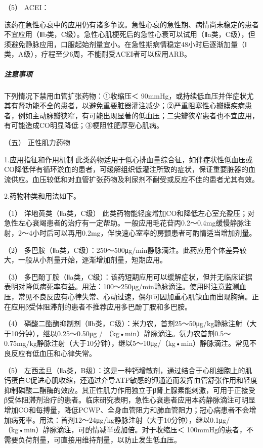 \hypertarget{text00071.htmlux5cux23CHP3-2-5-5-4-4-3-5}{}
（5） ACEI：

该药在急性心衰中的应用仍有诸多争议。急性心衰的急性期、病情尚未稳定的患者不宜应用（Ⅱb类，C级）。急性心肌梗死后的急性心衰可以试用（Ⅱa类，C级），但须避免静脉应用，口服起始剂量宜小。在急性期病情稳定48小时后逐渐加量（Ⅰ类，A级），疗程至少6周，不能耐受ACEI者可以应用ARB。

\subparagraph{注意事项}

下列情况下禁用血管扩张药物：①收缩压＜
90mmHg，或持续低血压并伴症状尤其有肾功能不全的患者，以避免重要脏器灌注减少；②严重阻塞性心瓣膜疾病患者，例如主动脉瓣狭窄，有可能出现显著的低血压；二尖瓣狭窄患者也不宜应用，有可能造成CO明显降低；③梗阻性肥厚型心肌病。

\hypertarget{text00071.htmlux5cux23CHP3-2-5-5-4-5}{}
（五） 正性肌力药物

1.应用指征和作用机制
此类药物适用于低心排血量综合征，如伴症状性低血压或CO降低伴有循环淤血的患者，可缓解组织低灌注所致的症状，保证重要脏器的血流供应。血压较低和对血管扩张药物及利尿剂不耐受或反应不佳的患者尤其有效。

2.药物种类和用法如下。

（1） 洋地黄类（Ⅱa类，C级）
此类药物能轻度增加CO和降低左心室充盈压；对急性左心衰竭患者的治疗有一定帮助。一般应用毛花苷丙0.2～0.4mg缓慢静脉注射，2～4小时后可以再用0.2mg，伴快速心室率的房颤患者可酌情适当增加剂量。

（2）
多巴胺（Ⅱa类，C级）：250～500μg/min静脉滴注。此药应用个体差异较大，一般从小剂量开始，逐渐增加剂量，短期应用。

（3）
多巴酚丁胺（Ⅱa类，C级）：该药短期应用可以缓解症状，但并无临床证据表明对降低病死率有益。用法：100～250μg/min静脉滴注。使用时注意监测血压，常见不良反应有心律失常、心动过速，偶尔可因加重心肌缺血而出现胸痛。正在应用β受体阻滞剂的患者不推荐应用多巴酚丁胺和多巴胺。

（4）
磷酸二酯酶抑制剂（Ⅱb类，C级）：米力农，首剂25～50μg/kg静脉注射（大于10分钟），继以0.25～0.50μg
/
（kg•min）静脉滴注。氨力农首剂0.5～0.75mg/kg静脉注射（大于10分钟），继以5～10μg/（kg•min）静脉滴注。常见不良反应有低血压和心律失常。

（5）
左西孟旦（Ⅱa类，B级）：这是一种钙增敏剂，通过结合于心肌细胞上的肌钙蛋白C促进心肌收缩，还通过介导ATP敏感的钾通道而发挥血管舒张作用和轻度抑制磷酸二酯酶的效应。其正性肌力作用独立于β肾上腺素能刺激，可用于正接受β受体阻滞剂治疗的患者。临床研究表明，急性心衰患者应用本药静脉滴注可明显增加CO和每搏量，降低PCWP、全身血管阻力和肺血管阻力；冠心病患者不会增加病死率。用法：首剂12～24μg/kg静脉注射（大于10分钟），继以0.1μg/（kg•min）静脉滴注，可酌情减半或加倍。对于收缩压＜
100mmHg的患者，不需要负荷剂量，可直接用维持剂量，以防止发生低血压。

